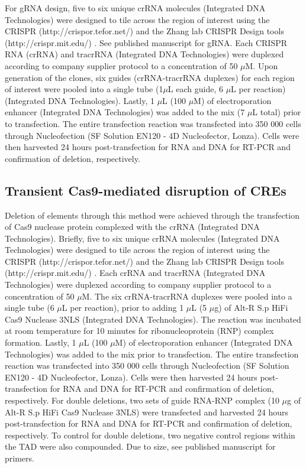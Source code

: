For gRNA design, five to six unique crRNA molecules (Integrated DNA Technologies) were designed to tile across the region of interest using the CRISPR (http://crispor.tefor.net/) \cite{haeusslerEvaluationOfftargetOntarget2016} and the Zhang lab CRISPR Design tools (http://crispr.mit.edu/) \cite{hsuDNATargetingSpecificity2013}.
See published manuscript for gRNA.
Each CRISPR RNA (crRNA) and tracrRNA (Integrated DNA Technologies) were duplexed according to company supplier protocol to a concentration of 50 $\mu$M.
Upon generation of the clones, six guides (crRNA-tracrRNA duplexes) for each region of interest were pooled into a single tube (1$\mu$L each guide, 6 $\mu$L per reaction) (Integrated DNA Technologies).
Lastly, 1 $\mu$L (100 $\mu$M) of electroporation enhancer (Integrated DNA Technologies) was added to the mix (7 $\mu$L total) prior to transfection.
The entire transfection reaction was transfected into 350 000 cells through Nucleofection (SF Solution EN120 - 4D Nucleofector, Lonza).
Cells were then harvested 24 hours post-transfection for RNA and DNA for RT-PCR and confirmation of deletion, respectively.

\subsection{Transient Cas9-mediated disruption of CREs}

Deletion of elements through this method were achieved through the transfection of Cas9 nuclease protein complexed with the crRNA (Integrated DNA Technologies).
Briefly, five to six unique crRNA molecules (Integrated DNA Technologies) were designed to tile across the region of interest using the CRISPR (http://crispor.tefor.net/) \cite{haeusslerEvaluationOfftargetOntarget2016} and the Zhang lab CRISPR Design tools (http://crispr.mit.edu/) \cite{hsuDNATargetingSpecificity2013}.
Each crRNA and tracrRNA (Integrated DNA Technologies) were duplexed according to company supplier protocol to a concentration of 50 $\mu$M.
The six crRNA-tracrRNA duplexes were pooled into a single tube (6 $\mu$L per reaction), prior to adding 1 $\mu$L (5 $\mu$g) of Alt-R \textregistered S.p HiFi Cas9 Nuclease 3NLS (Integrated DNA Technologies).
The reaction was incubated at room temperature for 10 minutes for ribonucleoprotein (RNP) complex formation.
Lastly, 1 $\mu$L (100 $\mu$M) of electroporation enhancer (Integrated DNA Technologies) was added to the mix prior to transfection.
The entire transfection reaction was transfected into 350 000 cells through Nucleofection (SF Solution EN120 - 4D Nucleofector, Lonza).
Cells were then harvested 24 hours post-transfection for RNA and DNA for RT-PCR and confirmation of deletion, respectively.
For double deletions, two sets of guide RNA-RNP complex (10 $\mu$g of Alt-R \textregistered S.p HiFi Cas9 Nuclease 3NLS) were transfected and harvested 24 hours post-transfection for RNA and DNA for RT-PCR and confirmation of deletion, respectively.
To control for double deletions, two negative control regions within the TAD were also compounded.
Due to size, see published manuscript for primers.

